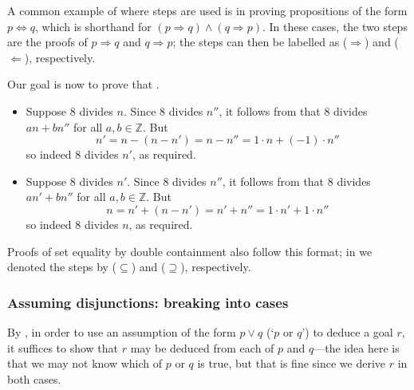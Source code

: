 A common example of where steps are used is in proving propositions of the form $p \Leftrightarrow q$, which is shorthand for $(p \Rightarrow q) \wedge (q \Rightarrow p)$. In these cases, the two steps are the proofs of $p \Rightarrow q$ and $q \Rightarrow p$; the steps can then be labelled as ($\Rightarrow$) and ($\Leftarrow$), respectively.

\begin{extract}
\label{xtrStepsExample}
Our goal is now to prove that .

\begin{itemize}
\item \xtremph{($\Rightarrow$)} Suppose $8$ divides $n$. Since $8$ divides $n''$, it follows from  that $8$ divides $an+bn''$ for all $a,b \in \mathbb{Z}$. But
\[
n' = n-(n-n') = n-n'' = 1 \cdot n + (-1) \cdot n''
\]
so indeed $8$ divides $n'$, as required.
\item \xtremph{($\Leftarrow$)}  Suppose $8$ divides $n'$. Since $8$ divides $n''$, it follows from  that $8$ divides $an'+bn''$ for all $a,b \in \mathbb{Z}$. But
\[
n = n'+(n-n') = n'+n'' = 1 \cdot n' + 1 \cdot n''
\]
so indeed $8$ divides $n$, as required.
\end{itemize}
\end{extract}

Proofs of set equality by double containment also follow this format; in  we denoted the steps by ($\subseteq$) and ($\supseteq$), respectively.

\subsubsection*{Assuming disjunctions: breaking into cases}

By , in order to use an assumption of the form $p \vee q$ (`$p$ or $q$') to deduce a goal $r$, it suffices to show that $r$ may be deduced from each of $p$ and $q$---the idea here is that we may not know which of $p$ or $q$ is true, but that is fine since we derive $r$ in both cases.

